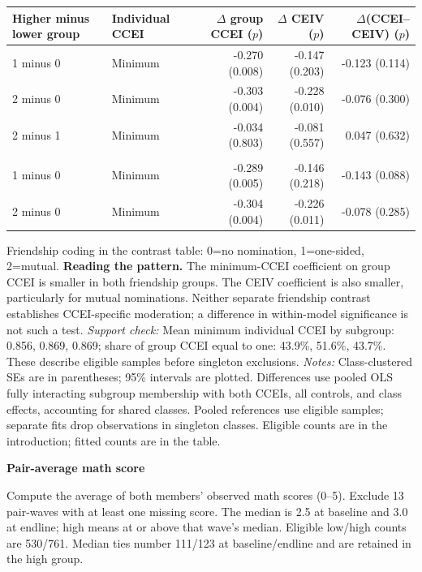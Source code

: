\documentclass[11pt]{article}
\begin{document}
\begin{center}\begin{tabular}{llrrr}\toprule
Higher minus lower group & Individual CCEI & $\Delta$ group CCEI ($p$) & $\Delta$ CEIV ($p$) & $\Delta$(CCEI--CEIV) ($p$)\\\midrule
1 minus 0 & Minimum & -0.270 (0.008) & -0.147 (0.203) & -0.123 (0.114)\\
2 minus 0 & Minimum & -0.303 (0.004) & -0.228 (0.010) & -0.076 (0.300)\\
2 minus 1 & Minimum & -0.034 (0.803) & -0.081 (0.557) & 0.047 (0.632)\\
\addlinespace\multicolumn{5}{l}{\textit{Wave-fixed-effects check: minimum CCEI}}\\
1 minus 0 & Minimum & -0.289 (0.005) & -0.146 (0.218) & -0.143 (0.088)\\
2 minus 0 & Minimum & -0.304 (0.004) & -0.226 (0.011) & -0.078 (0.285)\\
\bottomrule\end{tabular}\end{center}
Friendship coding in the contrast table: 0=no nomination, 1=one-sided, 2=mutual.
\textbf{Reading the pattern.} The minimum-CCEI coefficient on group CCEI is smaller in both friendship groups. The CEIV coefficient is also smaller, particularly for mutual nominations. Neither separate friendship contrast establishes CCEI-specific moderation; a difference in within-model significance is not such a test.
\textit{Support check:} Mean minimum individual CCEI by subgroup: 0.856, 0.869, 0.869; share of group CCEI equal to one: 43.9\%, 51.6\%, 43.7\%. These describe eligible samples before singleton exclusions.
\textit{Notes:} Class-clustered SEs are in parentheses; 95\% intervals are plotted. Differences use pooled OLS fully interacting subgroup membership with both CCEIs, all controls, and class effects, accounting for shared classes. Pooled references use eligible samples; separate fits drop observations in singleton classes. Eligible counts are in the introduction; fitted counts are in the table.
\clearpage
\begin{center}\Large\textbf{Pair-average math score}\end{center}
\small
Compute the average of both members' observed math scores (0--5). Exclude 13 pair-waves with at least one missing score. The median is 2.5 at baseline and 3.0 at endline; high means at or above that wave's median. Eligible low/high counts are 530/761. Median ties number 111/123 at baseline/endline and are retained in the high group.
\end{document}
